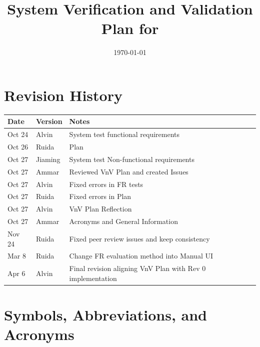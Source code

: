 \documentclass[12pt, titlepage]{article}
\begin{document}
\title{System Verification and Validation Plan for \\\progname{}} 
\author{
\authname
}
\date{\today}
	
\maketitle


\section*{Revision History}

\begin{tabularx}{\textwidth}{p{3cm}p{2cm}X}
\toprule {\bf Date} & {\bf Version} & {\bf Notes}\\
\midrule
Oct 24 & Alvin & System test functional requirements\\
Oct 26 & Ruida & Plan\\
Oct 27 & Jiaming & System test Non-functional requirements\\
Oct 27 & Ammar & Reviewed VnV Plan and created Issues \\
Oct 27 & Alvin & Fixed errors in FR tests\\
Oct 27 & Ruida & Fixed errors in Plan \\
Oct 27 & Alvin & VnV Plan Reflection \\
Oct 27 & Ammar & Acronyms and General Information \\
Nov 24 & Ruida & Fixed peer review issues and keep consistency\\
Mar 8 & Ruida & Change FR evaluation method into Manual UI\\
Apr 6 & Alvin & Final revision aligning VnV Plan with Rev 0 implementation\\
\bottomrule
\end{tabularx}


\newpage

\tableofcontents
\newpage
{}

\section{Symbols, Abbreviations, and Acronyms}
\end{document}
